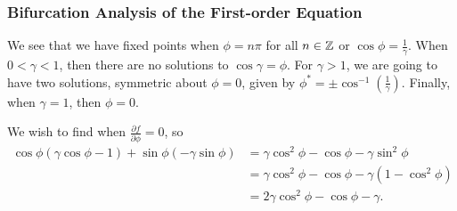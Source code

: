 \documentclass[class=article, crop=false]{standalone}
\begin{document}
  \subsubsection{Bifurcation Analysis of the First-order Equation}
  We see that we have fixed points when $\phi = n\pi$ for all $n\in\mathbb{Z}$ or $\cos\phi = \frac{1}{\gamma}$. When $0 < \gamma < 1$, then there are no solutions to $\cos\gamma = \phi$. For $\gamma > 1$, we are going to have two solutions, symmetric about $\phi = 0$, given by $\phi^* = \pm \cos^{-1}(\frac{1}{\gamma})$. Finally, when $\gamma = 1$, then $\phi = 0$. \par
  We wish to find when $\frac{\partial f}{\partial \phi} = 0$, so
  \begin{align*}
    \cos\phi(\gamma\cos\phi - 1) + \sin\phi(-\gamma\sin\phi) &= \gamma\cos^2\phi - \cos\phi - \gamma\sin^2\phi \\
                                                             &= \gamma\cos^2\phi - \cos\phi - \gamma(1 - \cos^2\phi) \\
                                                             &= 2\gamma\cos^2\phi - \cos\phi - \gamma.
  \end{align*}
\end{document}
